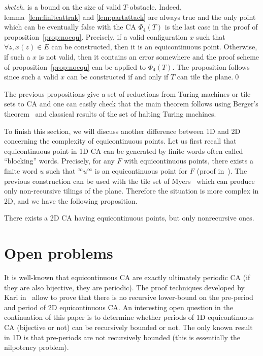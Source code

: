 \documentclass{llncs}
\newcommand{\acf}{F}
\newcommand{\phiemboit}{\Phi_4}
\begin{document}
\begin{proof}[sketch]
  is a bound on the size of valid $T$-obstacle. Indeed,
  lemma~\ref{lem:finiteattrak} and \ref{lem:partattack} are always
  true and the only point which can be eventually false with the CA
  $\phiemboit(T)$ is the last case in the proof of
  proposition~\ref{prop:noequ}. Precisely, if a valid configuration
  $x$ such that ${\forall z, x(z)\in E}$ can be constructed, then it
  is an equicontinuous point. Otherwise, if such a $x$ is not valid,
  then it contains an error somewhere and the proof scheme of
  proposition~\ref{prop:noequ} can be applied to $\phiemboit(T)$. The
  proposition follows since such a valid $x$ can be constructed if and
  only if $T$ can tile the plane.\qed
\end{proof}

The previous propositions give a set of reductions from
Turing machines or tile sets to CA and one can easily check that the
main theorem follows using Berger's theorem~\cite{berger} and
classical results of the set of halting Turing machines.





To finish this section, we will discuss another difference between 1D
and 2D concerning the complexity of equicontinuous points. Let us
first recall that equicontinuous point in 1D CA can be generated by
finite words often called ``blocking'' words. Precisely, for any
$\acf$ with equicontinuous points, there exists a finite word $u$ such
that ${{}^\infty u^\infty}$ is an equicontinuous point for $\acf$
(proof in~\cite{Kurka97}). The previous construction can be used with
the tile set of Myers~\cite{myers} which can produce only
non-recursive tilings of the plane. Therefore the situation is more
complex in 2D, and we have the following proposition.

\begin{proposition}
  \label{prop:nonrecpoint}
  There exists a 2D CA having equicontinuous points, but only
  nonrecursive ones.
\end{proposition}


\section{Open problems}
\label{sec:open}

It is well-known that equicontinuous CA are exactly ultimately
periodic CA (if they are also bijective, they are periodic).  The
proof techniques developed by Kari in~\cite{kari94} allow to prove
that there is no recursive lower-bound on the pre-period and period of
2D equicontinuous CA. An interesting open question in the continuation
of this paper is to determine whether periods of 1D equicontinuous CA
(bijective or not) can be recursively bounded or not. The only known
result in 1D is that pre-periods are not recursively bounded (this is
essentially the nilpotency problem).
\end{document}
